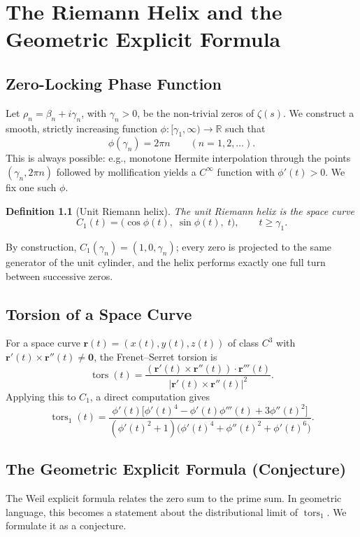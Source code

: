 \documentclass[12pt,a4paper,oneside]{book}
\newtheorem{definition}[theorem]{Definition}
\newcommand{\R}{\mathbb{R}}
\newcommand{\tors}{\operatorname{tors}}
\begin{document}
\chapter{The Riemann Helix and the Geometric Explicit Formula}

\section{Zero-Locking Phase Function}
Let \(\rho_n = \beta_n + i\gamma_n\), with \(\gamma_n>0\), be the non‑trivial zeros of \(\zeta(s)\).  We construct a smooth, strictly increasing function \(\phi:[\gamma_1,\infty)\to\R\) such that
\[
\phi(\gamma_n) = 2\pi n \qquad (n=1,2,\dots).
\]
This is always possible: e.g., monotone Hermite interpolation through the points \((\gamma_n,2\pi n)\) followed by mollification yields a \(C^\infty\) function with \(\phi'(t)>0\).  We fix one such \(\phi\).

\begin{definition}[Unit Riemann helix]
The \emph{unit Riemann helix} is the space curve
\[
C_1(t) = \bigl( \cos\phi(t),\; \sin\phi(t),\; t \bigr),\qquad t\ge\gamma_1 .
\]
\end{definition}
By construction, \(C_1(\gamma_n) = (1,0,\gamma_n)\); every zero is projected to the same generator of the unit cylinder, and the helix performs exactly one full turn between successive zeros.

\section{Torsion of a Space Curve}
For a space curve \(\mathbf{r}(t)=(x(t),y(t),z(t))\) of class \(C^3\) with \(\mathbf{r}'(t)\times\mathbf{r}''(t)\neq\mathbf{0}\), the Frenet–Serret torsion is
\[
\tors(t) = \frac{(\mathbf{r}'(t)\times\mathbf{r}''(t))\cdot\mathbf{r}'''(t)}{|\mathbf{r}'(t)\times\mathbf{r}''(t)|^2}.
\]
Applying this to \(C_1\), a direct computation gives
\begin{equation}\label{tors_formula}
\tors_1(t) = \frac{\phi'(t)\bigl[ \phi'(t)^4 - \phi'(t)\phi'''(t) + 3\phi''(t)^2 \bigr]}
                  {(\phi'(t)^2+1)\bigl( \phi'(t)^4 + \phi''(t)^2 + \phi'(t)^6 \bigr)} .
\end{equation}

\section{The Geometric Explicit Formula (Conjecture)}
The Weil explicit formula relates the zero sum to the prime sum.  In geometric language, this becomes a statement about the distributional limit of \(\tors_1\).  We formulate it as a conjecture.
\end{document}
